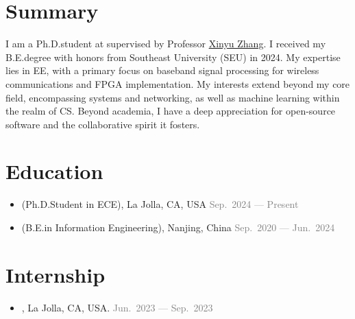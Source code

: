 \documentclass{color-cv}
\begin{document}

\maketitle

\section{Summary}
I am a Ph.D.\@ student at  supervised by Professor \href{http://xyzhang.ucsd.edu}{\color{black}Xinyu Zhang}.
I received my B.E.\@ degree with honors from Southeast University (SEU) in 2024.
My expertise lies in EE, with a primary focus on baseband signal processing for wireless communications and FPGA implementation.
My interests extend beyond my core field, encompassing systems and networking, as well as machine learning within the realm of CS.
Beyond academia, I have a deep appreciation for open-source software and the collaborative spirit it fosters.

\section{Education}
\begin{itemize}
  \item {} (Ph.D.\@ Student in ECE), La Jolla, CA, USA
  \hfill\textcolor{gray}{Sep.~2024 --- Present}
  \item {} (B.E.\@ in Information Engineering), Nanjing, China
  \hfill\textcolor{gray}{Sep.~2020 --- Jun.~2024}
\end{itemize}

\section{Internship}
\begin{itemize}
  \item {}, La Jolla, CA, USA.
  \hfill\textcolor{gray}{Jun.~2023 --- Sep.~2023}
\end{itemize}
\end{document}
